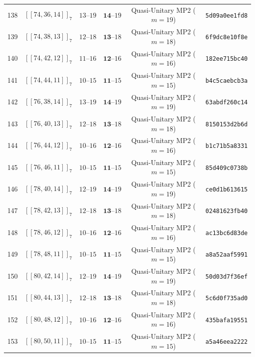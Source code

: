 \documentclass[11pt,a4paper]{article}
\theoremstyle{remark}
\begin{document}
{\begin{longtable}{@{}rccccl@{}}
138 & $[[74,36,14]]_{7}$ & $13\text{--}19$ & $\mathbf{14}\text{--}19$ & Quasi-Unitary MP2 ($m=19$) & \texttt{5d09a0ee1fd8} \\
139 & $[[74,38,13]]_{7}$ & $12\text{--}18$ & $\mathbf{13}\text{--}18$ & Quasi-Unitary MP2 ($m=18$) & \texttt{6f9dc8e10f8e} \\
140 & $[[74,42,12]]_{7}$ & $11\text{--}16$ & $\mathbf{12}\text{--}16$ & Quasi-Unitary MP2 ($m=16$) & \texttt{182ee715bc40} \\
141 & $[[74,44,11]]_{7}$ & $10\text{--}15$ & $\mathbf{11}\text{--}15$ & Quasi-Unitary MP2 ($m=15$) & \texttt{b4c5caebcb3a} \\
142 & $[[76,38,14]]_{7}$ & $13\text{--}19$ & $\mathbf{14}\text{--}19$ & Quasi-Unitary MP2 ($m=19$) & \texttt{63abdf260c14} \\
143 & $[[76,40,13]]_{7}$ & $12\text{--}18$ & $\mathbf{13}\text{--}18$ & Quasi-Unitary MP2 ($m=18$) & \texttt{8150153d2b6d} \\
144 & $[[76,44,12]]_{7}$ & $10\text{--}16$ & $\mathbf{12}\text{--}16$ & Quasi-Unitary MP2 ($m=16$) & \texttt{b1c71b5a8331} \\
145 & $[[76,46,11]]_{7}$ & $10\text{--}15$ & $\mathbf{11}\text{--}15$ & Quasi-Unitary MP2 ($m=15$) & \texttt{85d409c0738b} \\
146 & $[[78,40,14]]_{7}$ & $12\text{--}19$ & $\mathbf{14}\text{--}19$ & Quasi-Unitary MP2 ($m=19$) & \texttt{ce0d1b613615} \\
147 & $[[78,42,13]]_{7}$ & $12\text{--}18$ & $\mathbf{13}\text{--}18$ & Quasi-Unitary MP2 ($m=18$) & \texttt{02481623fb40} \\
148 & $[[78,46,12]]_{7}$ & $10\text{--}16$ & $\mathbf{12}\text{--}16$ & Quasi-Unitary MP2 ($m=16$) & \texttt{ac13bc6d83de} \\
149 & $[[78,48,11]]_{7}$ & $10\text{--}15$ & $\mathbf{11}\text{--}15$ & Quasi-Unitary MP2 ($m=15$) & \texttt{a8a52aaf5991} \\
150 & $[[80,42,14]]_{7}$ & $12\text{--}19$ & $\mathbf{14}\text{--}19$ & Quasi-Unitary MP2 ($m=19$) & \texttt{50d03d7f36ef} \\
151 & $[[80,44,13]]_{7}$ & $12\text{--}18$ & $\mathbf{13}\text{--}18$ & Quasi-Unitary MP2 ($m=18$) & \texttt{5c6d0f735ad0} \\
152 & $[[80,48,12]]_{7}$ & $10\text{--}16$ & $\mathbf{12}\text{--}16$ & Quasi-Unitary MP2 ($m=16$) & \texttt{435bafa19551} \\
153 & $[[80,50,11]]_{7}$ & $10\text{--}15$ & $\mathbf{11}\text{--}15$ & Quasi-Unitary MP2 ($m=15$) & \texttt{a5a46eea2222} \\

\end{longtable}}
\end{document}
